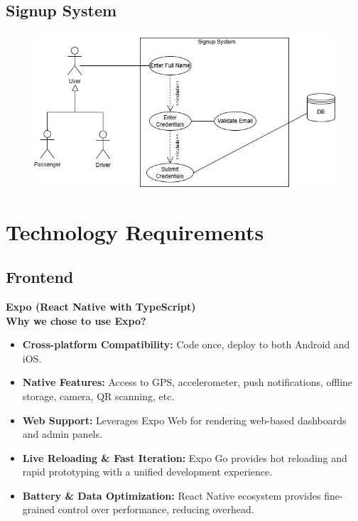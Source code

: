 \documentclass[a4paper,12pt]{article}
\begin{document}
  \subsection*{Signup System}
    \begin{figure}[H]
      \centering
      \includegraphics[width=1\textwidth]{Signup System.jpg} 
    \end{figure}

\section{Technology Requirements}

\subsection{Frontend}
\textbf{Expo (React Native with TypeScript)}\\
\textbf{Why we chose to use Expo?}
\begin{itemize}
    \item \textbf{Cross-platform Compatibility:} Code once, deploy to both Android and iOS.
    \item \textbf{Native Features:} Access to GPS, accelerometer, push notifications, offline storage, camera, QR scanning, etc.
    \item \textbf{Web Support:} Leverages Expo Web for rendering web-based dashboards and admin panels.
    \item \textbf{Live Reloading \& Fast Iteration:} Expo Go provides hot reloading and rapid prototyping with a unified development experience.
    \item \textbf{Battery \& Data Optimization:} React Native ecosystem provides fine-grained control over performance, reducing overhead.
\end{itemize}
\end{document}
